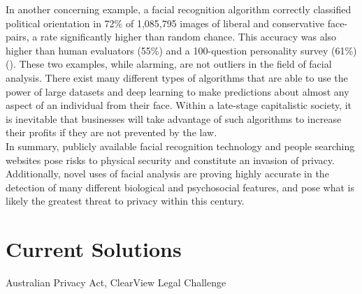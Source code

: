 \documentclass{article}
\begin{document}
In another concerning example, a facial recognition algorithm correctly classified political orientation in 72\% of 1,085,795 images of liberal and conservative face-pairs, a rate significantly higher than random chance. This accuracy was also higher than human evaluators (55\%) and a 100-question personality survey (61\%) (\cite{Kosinski2021}). These two examples, while alarming, are not outliers in the field of facial analysis. There exist many different types of algorithms that are able to use the power of large datasets and deep learning to make predictions about almost any aspect of an individual from their face. Within a late-stage capitalistic society, it is inevitable that businesses will take advantage of such algorithms to increase their profits if they are not prevented by the law.
\vspace{0.3cm} \\
In summary, publicly available facial recognition technology and people searching websites pose risks to physical security and constitute an invasion of privacy. Additionally, novel uses of facial analysis are proving highly accurate in the detection of many different biological and psychosocial features, and pose what is likely the greatest threat to privacy within this century.
\section*{\fontsize{10}{12}\selectfont Current Solutions}
Australian Privacy Act, ClearView Legal Challenge
\end{document}
